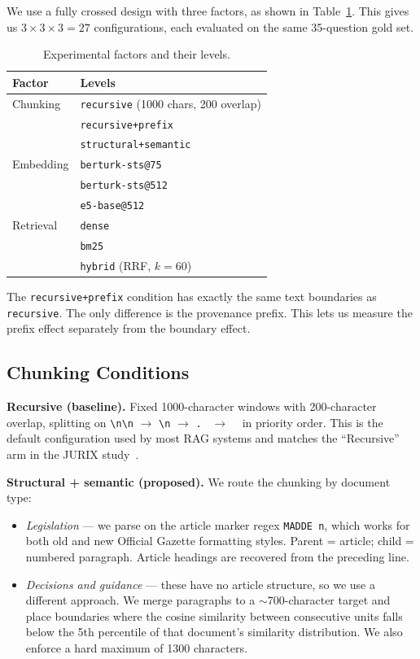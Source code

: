 \documentclass[11pt,a4paper,twocolumn]{article}
\begin{document}
We use a fully crossed design with three factors, as shown in Table~\ref{tab:factors}. This gives us $3 \times 3 \times 3 = 27$ configurations, each evaluated on the same 35-question gold set.

\begin{table}[t]
\centering
\caption{Experimental factors and their levels.}
\label{tab:factors}
\small
\begin{tabular}{@{}ll@{}}
\toprule
\textbf{Factor} & \textbf{Levels} \\
\midrule
Chunking   & \texttt{recursive} (1000 chars, 200 overlap) \\
           & \texttt{recursive+prefix} \\
           & \texttt{structural+semantic} \\
\midrule
Embedding  & \texttt{berturk-sts@75} \\
           & \texttt{berturk-sts@512} \\
           & \texttt{e5-base@512} \\
\midrule
Retrieval  & \texttt{dense} \\
           & \texttt{bm25} \\
           & \texttt{hybrid} (RRF, $k{=}60$) \\
\bottomrule
\end{tabular}
\end{table}

The \texttt{recursive+prefix} condition has exactly the same text boundaries as \texttt{recursive}. The only difference is the provenance prefix. This lets us measure the prefix effect separately from the boundary effect.

\subsection{Chunking Conditions}

\textbf{Recursive (baseline).} Fixed 1000-character windows with 200-character overlap, splitting on \texttt{\textbackslash n\textbackslash n} $\rightarrow$ \texttt{\textbackslash n} $\rightarrow$ \texttt{. } $\rightarrow$ \texttt{ } in priority order. This is the default configuration used by most RAG systems and matches the ``Recursive'' arm in the JURIX study~\cite{jurix2024}.

\textbf{Structural + semantic (proposed).} We route the chunking by document type:

\begin{itemize}[leftmargin=*]
  \item \textit{Legislation} --- we parse on the article marker regex \texttt{MADDE~n}, which works for both old and new Official Gazette formatting styles. Parent = article; child = numbered paragraph. Article headings are recovered from the preceding line.
  \item \textit{Decisions and guidance} --- these have no article structure, so we use a different approach. We merge paragraphs to a ${\sim}$700-character target and place boundaries where the cosine similarity between consecutive units falls below the 5th percentile of that document's similarity distribution. We also enforce a hard maximum of 1300 characters.
\end{itemize}
\end{document}
